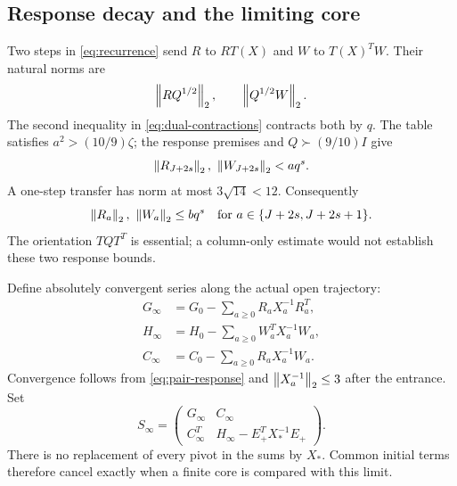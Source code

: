 \subsection{Response decay and the limiting core}

Two steps in \eqref{eq:recurrence} send $R$ to $RT(X)$ and $W$ to
$T(X)^TW$. Their natural norms are
\[
 \left\lVert RQ^{1/2}\right\rVert_2,\qquad \left\lVert Q^{1/2}W\right\rVert_2.
\]
The second inequality in \eqref{eq:dual-contractions} contracts both
by $q$. The table satisfies $a^2>(10/9)\zeta$; the response premises and
$Q\succ(9/10)I$ give
\begin{equation}
 \norm{R_{J+2s}}_2,\ \norm{W_{J+2s}}_2<a q^s.
 \label{eq:even-response}
\end{equation}
A one-step transfer has norm at most $3\sqrt{14}<12$. Consequently
\begin{equation}
 \left\lVert R_a\right\rVert_2,\ \left\lVert W_a\right\rVert_2\le bq^s
 \quad\text{for }a\in\{J+2s,J+2s+1\}.
 \label{eq:pair-response}
\end{equation}
The orientation $TQT^T$ is essential; a column-only estimate would not
establish these two response bounds.

Define absolutely convergent series along the actual open trajectory:
\begin{align*}
 G_\infty&=G_0-\sum_{a\ge0}R_aX_a^{-1}R_a^T,\\
 H_\infty&=H_0-\sum_{a\ge0}W_a^TX_a^{-1}W_a,\\
 C_\infty&=C_0-\sum_{a\ge0}R_aX_a^{-1}W_a.
\end{align*}
Convergence follows from \eqref{eq:pair-response} and
$\left\lVert X_a^{-1}\right\rVert_2\le3$ after the entrance. Set
\begin{equation}
 S_\infty=\begin{pmatrix}
 G_\infty&C_\infty\\C_\infty^T&H_\infty-E_+^TX_*^{-1}E_+
 \end{pmatrix}.
 \label{eq:Sinfty}
\end{equation}
There is no replacement of every pivot in the sums by $X_*$.
Common initial terms therefore cancel exactly when a finite core is
compared with this limit.

